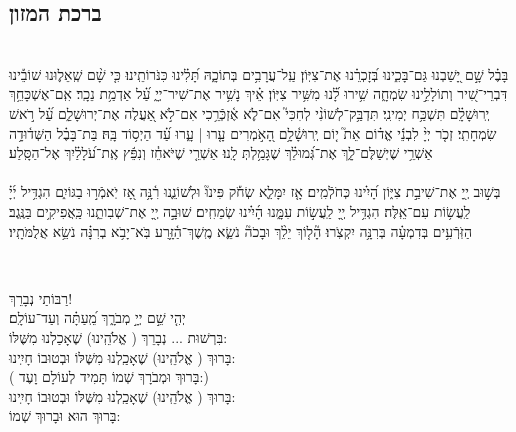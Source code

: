 \documentclass[a4paper, twoside, openany, parskip=half, 10pt]{article}
\begin{document}



\begin{multicols}{3}
\section{ ברכת המזון }
\\
בָּבֶ֗ל שָׁ֣ם יָ֭שַׁבְנוּ גַּם־בָּכִ֑ינוּ בְּ֝זָכְרֵ֗נוּ אֶת־צִיּֽוֹן׃ 
 עַֽל־עֲרָבִ֥ים בְּתוֹכָ֑הּ תָּ֝לִ֗ינוּ כִּנֹּרוֹתֵֽינוּ׃ 
 כִּ֤י שָׁ֨ם שְֽׁאֵל֪וּנוּ שׁוֹבֵ֡ינוּ דִּבְרֵי־שִׁ֭יר וְתוֹלָלֵ֣ינוּ שִׂמְחָ֑ה שִׁ֥ירוּ לָ֝֗נוּ מִשִּׁ֥יר צִיּֽוֹן׃ 
 אֵ֗יךְ נָשִׁ֥יר אֶת־שִׁיר־יְיָ֑ עַ֝֗ל אַדְמַ֥ת נֵכָֽר׃ 
 אִֽם־אֶשְׁכָּחֵ֥ךְ יְֽרוּשָׁלִָ֗ם תִּשְׁכַּ֥ח יְמִינִֽי׃ 
 תִּדְבַּ֥ק־לְשׁוֹנִ֨י לְחִכִּי֮ אִם־לֹ֪א אֶ֫זְכְּֿרֵ֥כִי אִם־לֹ֣א אַ֭עֲלֶה אֶת־יְרוּשָׁלִַ֑ם עַ֝֗ל רֹ֣אשׁ שִׂמְחָתִֽי׃ 
 זְכֹ֤ר יְיָ֨ לִבְנֵ֬י אֱד֗וֹם אֵת֮ י֤וֹם יְֽרוּשָׁ֫לִָ֥ם הָ֭אֹ֣מְרִים עָ֤רוּ | עָ֑רוּ עַ֝֗ד הַיְס֥וֹד בָּֽהּ׃ 
 בַּת־בָּבֶ֗ל הַשְּׁד֫וּדָ֥ה אַשְׁרֵ֥י שֶׁיְשַׁלֶּם־לָ֑ךְ אֶת־גְּ֝מוּלֵ֗ךְ שֶׁגָּמַ֥לְתְּ לָֽנוּ׃ 
 אַשְׁרֵ֤י שֶׁיֹּאחֵ֓ז וְנִפֵּ֬ץ אֶֽת־עֹ֝לָלַ֗יִךְ אֶל־הַסָּֽלַע׃ \\
\\
בְּשׁ֣וּב יְ֖יָ אֶת־שִׁיבַ֣ת צִיּ֑וֹן הָ֝יִ֗ינוּ כְּחֹלְֿמִֽים׃ 
 אָ֤ז יִמָּלֵ֢א שְׂחֹ֡ק פִּינוּ֘ וּלְשׁוֹנֵ֢נוּ רִ֫נָּ֥ה אָ֭ז יֹֽאמְֿר֣וּ בַגּוֹיִ֑ם הִגְדִּ֥יל יְ֜יָ֗ לַֽעֲשׂ֥וֹת עִם־אֵֽלֶּה׃ 
 הִגְדִּ֥יל יְ֖יָ לַֽעֲשׂ֣וֹת עִמָּ֑נוּ הָ֜יִ֗ינוּ שְׂמֵחִֽים׃ 
 שׁוּבָ֣ה יְ֖יָ אֶת־שְׁבִותֵ֑נוּ כַּֽאֲפִיקִ֥ים בַּנֶּֽגֶב׃ 
 הַזֹּֽרְֿעִ֥ים בְּדִמְעָ֗ה בְּרִנָּ֥ה יִקְצֹֽרוּ׃ 
 הָ֘ל֤וֹךְ יֵלֵ֨ךְ וּבָכֹה֘ נֹשֵׂ֢א מֶֽשֶׁךְ־הַ֫זָּ֥רַע בֹּֽא־יָבֹ֥א בְרִנָּ֗ה נֹשֵׂ֥א אֲלֻמֹּתָֽיו׃ 
 
\\%
\begin{small}
רַבּוֹתַי נְבָרֵךְ!\\
 יְהִ֤י שֵׁ֣ם יְיָ֣ מְבֹרָ֑ךְ מֵֽ֝עַתָּ֗ה וְעַד־עוֹלָֽם׃\\
בִּרְשׁוּת ... נְבָרֵךְ ( אֱלֹהֵֽינוּ) שֶׁאָכַלְנוּ מִשֶּׁלּוֹ:\\
בָּרוּךְ ( אֱלֹהֵֽינוּ) שֶׁאָכַֽלְנוּ מִשֶּׁלּוֹ וּבְטוּבוֹ חָיִֽינוּ:\\
(
בָּרוּךְ וּמְבֹרָךְ שְׁמוֹ תָּמִיד לְעוֹלָם וָעֶד:)\\
בָּרוּךְ ( אֱלֹהֵֽינוּ) שֶׁאָכַֽלְנוּ מִשֶּׁלּוֹ וּבְטוּבוֹ חָיִֽינוּ:\\ 
 בָּרוּךְ הוּא וּבָרוּךְ שְׁמוֹ:
\end{small}


\end{multicols}
\end{document}
